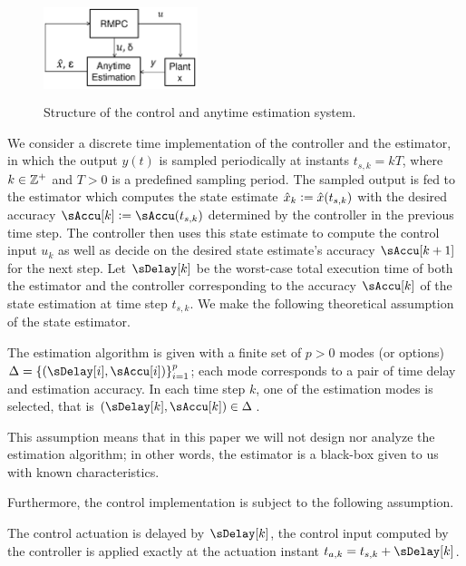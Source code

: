 \begin{figure}[tb]
	\centering
		\includegraphics[width=0.40\textwidth,height=30mm]{figs/ControlFigure_scissored.pdf}
	\caption{Structure of the control and anytime estimation system.}
	\label{fig:actual-system-diagram}
\end{figure}



We consider a discrete time implementation of the controller and the estimator, in which the output $y(t)$ is sampled periodically at instants $t_{s,k}=kT$,
where $k\in\mathbb{Z}^{+}$ and $T>0$ is a predefined sampling period.
The sampled output is fed to the estimator which computes the state
estimate $\hat{x}_{k}\mathrel{\mathop:}=\hat{x}(t_{s,k})$ with the desired
accuracy $\sAccu[k]\definedas\sAccu(t_{s,k})$ determined by the controller
in the previous time step. The controller then uses this state estimate
to compute the control input $u_{k}$ as well as decide on the desired
state estimate's accuracy $\sAccu[k+1]$ for the next step. Let $\sDelay[k]$
be the worst-case total execution time of both the estimator and the
controller corresponding to the accuracy $\sAccu[k]$ of the state
estimation at time step $t_{s,k}$. We make the following theoretical
assumption of the state estimator.
\begin{assumption}
The estimation algorithm is given with a finite set of $p>0$ modes
(or options) $\Delta=\left\{ \left(\sDelay[i],\sAccu[i]\right)\right\} _{i=1}^{p}$;
each mode corresponds to a pair of time delay and estimation accuracy.
In each time step $k$, one of the estimation modes is selected, that
is $\left(\sDelay[k],\sAccu[k]\right)\in\Delta$.
\end{assumption}

This assumption means that in this paper we will not design nor analyze
the estimation algorithm; in other words, the estimator is a black-box
given to us with known characteristics. 

Furthermore, the control implementation
is subject to the following assumption.
\begin{assumption}
The control actuation is delayed by $\sDelay[k]$,
\ie the control input computed by the controller is applied exactly
at the actuation instant $t_{a,k}=t_{s,k}+\sDelay[k]$.
\end{assumption}

